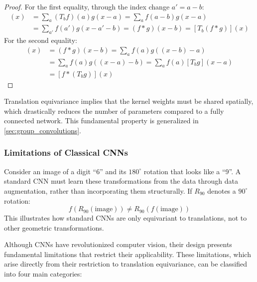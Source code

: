 \begin{proof}
For the first equality, through the index change $a' = a - b$:
\begin{align}
[(T_b f) * g](x) &= \sum_a (T_b f)(a) g(x - a) = \sum_a f(a - b) g(x - a) \\
                  &= \sum_{a'} f(a') g(x - a' - b) = (f * g)(x - b) = [T_b(f * g)](x)
\end{align}
For the second equality:
\begin{align}
[T_b(f * g)](x) &= (f * g)(x - b) = \sum_a f(a)g((x-b) - a) \\
                 &= \sum_a f(a)g((x - a) - b) = \sum_a f(a)[T_b g](x - a) \\
                 &= [f * (T_b g)](x)
\end{align}
\end{proof}

Translation equivariance implies that the kernel weights must be shared spatially, which drastically reduces the number of parameters compared to a fully connected network. This fundamental property is generalized in \autoref{sec:group_convolutions}.

\subsubsection{Limitations of Classical CNNs}

\begin{example}
Consider an image of a digit ``6'' and its $180^{\circ}$ rotation that looks like a ``9''. A standard \gls{CNN} must learn these transformations from the data through data augmentation, rather than incorporating them structurally. If $R_{90}$ denotes a $90^{\circ}$ rotation:
\[
f(R_{90}(\text{image})) \neq R_{90}(f(\text{image}))
\]
This illustrates how standard \glspl{CNN} are only equivariant to translations, not to other geometric transformations.
\end{example}

Although \glspl{CNN} have revolutionized computer vision, their design presents fundamental limitations that restrict their applicability. These limitations, which arise directly from their restriction to translation equivariance, can be classified into four main categories:

